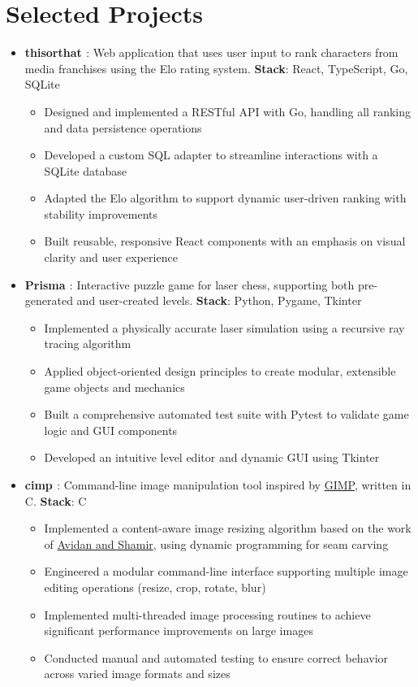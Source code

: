 \documentclass[letterpaper,11pt]{article}
\newcommand{\resumeItem}[2]{
  \item\small{
    \textbf{#1}{: #2 \vspace{-2pt}}
  }
}
\newcommand{\resumeSubItem}[2]{\resumeItem{#1}{#2}\vspace{-4pt}}
\newcommand{\resumeSubHeadingListStart}{\begin{itemize}[leftmargin=*]}
\newcommand{\resumeSubHeadingListEnd}{\end{itemize}}
\begin{document}
\section{Selected Projects}
  \resumeSubHeadingListStart
    \resumeSubItem{thisorthat \href{https://github.com/ansht2000/thisorthat}{\faGithub}}
      {Web application that uses user input to rank characters from media franchises using the Elo rating system. \textbf{Stack}: React, TypeScript, Go, SQLite}
      \begin{itemize}
          \item Designed and implemented a RESTful API with Go, handling all ranking and data persistence operations
          \item Developed a custom SQL adapter to streamline interactions with a SQLite database
          \item Adapted the Elo algorithm to support dynamic user-driven ranking with stability improvements
          \item Built reusable, responsive React components with an emphasis on visual clarity and user experience
      \end{itemize}
    \resumeSubItem{Prisma \href{https://github.com/ansht2000/Prisma}{\faGithub}}
      {Interactive puzzle game for laser chess, supporting both pre-generated and user-created levels. \textbf{Stack}: Python, Pygame, Tkinter}
      \begin{itemize}
          \item Implemented a physically accurate laser simulation using a recursive ray tracing algorithm
          \item Applied object-oriented design principles to create modular, extensible game objects and mechanics
          \item Built a comprehensive automated test suite with Pytest to validate game logic and GUI components
          \item Developed an intuitive level editor and dynamic GUI using Tkinter
      \end{itemize}
    \resumeSubItem{cimp \href{https://github.com/ansht2000/cimp}{\faGithub}}
      {Command-line image manipulation tool inspired by \href{https://www.gimp.org/}{GIMP}, written in C. \textbf{Stack}: C}
      \begin{itemize}
          \item Implemented a content-aware image resizing algorithm based on the work of \href{https://dl.acm.org/doi/pdf/10.1145/1275808.1276390}{Avidan and Shamir}, using dynamic programming for seam carving
          \item Engineered a modular command-line interface supporting multiple image editing operations (resize, crop, rotate, blur)
          \item Implemented multi-threaded image processing routines to achieve significant performance improvements on large images
          \item Conducted manual and automated testing to ensure correct behavior across varied image formats and sizes
      \end{itemize}
  \resumeSubHeadingListEnd
\end{document}

